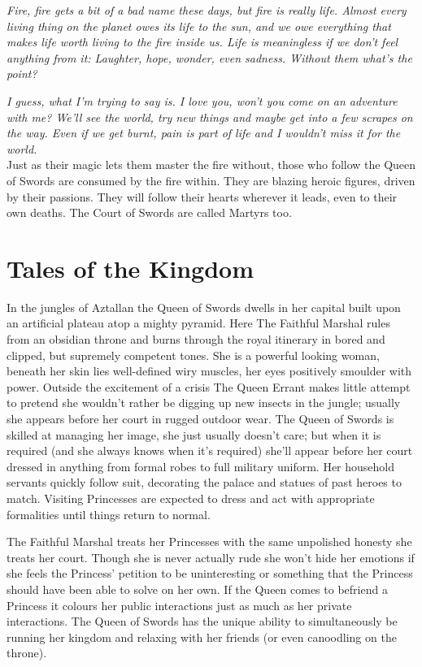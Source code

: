 \noindent \textit{Fire, fire gets a bit of a bad name these days, but fire is really life. Almost every living thing on the planet owes its life to the sun, and we owe everything that makes life worth living to the fire inside us. Life is meaningless if we don't feel anything from it: Laughter, hope, wonder, even sadness. Without them what's the point?}

\textit{I guess, what I'm trying to say is. I love you, won't you come on an adventure with me? We'll see the world, try new things and maybe get into a few scrapes on the way. Even if we get burnt, pain is part of life and I wouldn't miss it for the world.}\\

\noindent Just as their magic lets them master the fire without, those who follow the Queen of Swords are consumed by the fire within. They are blazing heroic figures, driven by their passions. They will follow their hearts wherever it leads, even to their own deaths. The Court of Swords are called Martyrs too. 

\section*{Tales of the Kingdom}

In the jungles of Aztallan the Queen of Swords dwells in her capital built upon an artificial plateau atop a mighty pyramid. Here The Faithful Marshal rules from an obsidian throne and burns through the royal itinerary in bored and clipped, but supremely competent tones. She is a powerful looking woman, beneath her skin lies well-defined wiry muscles, her eyes positively smoulder with power. Outside the excitement of a crisis The Queen Errant makes little attempt to pretend she wouldn't rather be digging up new insects in the jungle; usually she appears before her court in rugged outdoor wear. The Queen of Swords is skilled at managing her image, she just usually doesn't care; but when it is required (and she always knows when it's required) she'll appear before her court dressed in anything from formal robes to full military uniform. Her household servants quickly follow suit, decorating the palace and statues of past heroes to match. Visiting Princesses are expected to dress and act with appropriate 
formalities until things return to normal.

The Faithful Marshal treats her Princesses with the same unpolished honesty she treats her court. Though she is never actually rude she won't hide her emotions if she feels the Princess' petition to be uninteresting or something that the Princess should have been able to solve on her own. If the Queen comes to befriend a Princess it colours her public interactions just as much as her private interactions. The Queen of Swords has the unique ability to simultaneously be running her kingdom and relaxing with her friends (or even canoodling on the throne).

